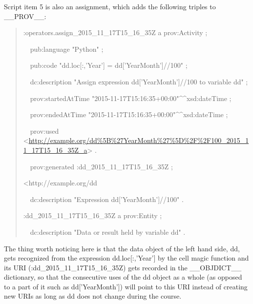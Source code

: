 Script item 5 is also an assignment, which adds the following triples to \_\_PROV\_\_:
\begin{quotation}
	\noindent :operators.assign\_2015\_11\_17T15\_16\_35Z a prov:Activity ;
	
	\noindent\ \ pub:language "Python" ;
	
	\noindent\ \ pub:code "dd.loc[:,'Year'] = dd['YearMonth']//100" ;
	
	\noindent\ \ dc:description "Assign expression dd['YearMonth']//100 to variable dd" ;
	
	\noindent\ \ prov:startedAtTime "2015-11-17T15:16:35+00:00"\^{}\^{}xsd:dateTime ;
	
	\noindent\ \ prov:endedAtTime "2015-11-17T15:16:35+00:00"\^{}\^{}xsd:dateTime ;
	
	\noindent\ \ prov:used <\url{http://example.org/dd%5B%27YearMonth%27%5D%2F%2F100_2015_11_17T15_16_35Z_a}> .
	
	\noindent\ \ prov:generated :dd\_2015\_11\_17T15\_16\_35Z ;
	
	\noindent<http://example.org/dd%
	
	\noindent\ \ dc:description "Expression dd['YearMonth']//100" .
	
	\noindent:dd\_2015\_11\_17T15\_16\_35Z a prov:Entity ;
	
	\noindent\ \ dc:description "Data or result held by variable dd" .
\end{quotation}
The thing worth noticing here is that the data object of the left hand side, dd, gets recognized from the expression dd.loc[:,'Year'] by the cell magic function and its URI (:dd\_2015\_11\_17T15\_16\_35Z) gets recorded in the \_\_OBJDICT\_\_ dictionary, so that the consecutive uses of the dd object as a whole (as opposed to a part of it such as dd['YearMonth']) will point to this URI instead of creating new URIs as long as dd does not change during the course.

